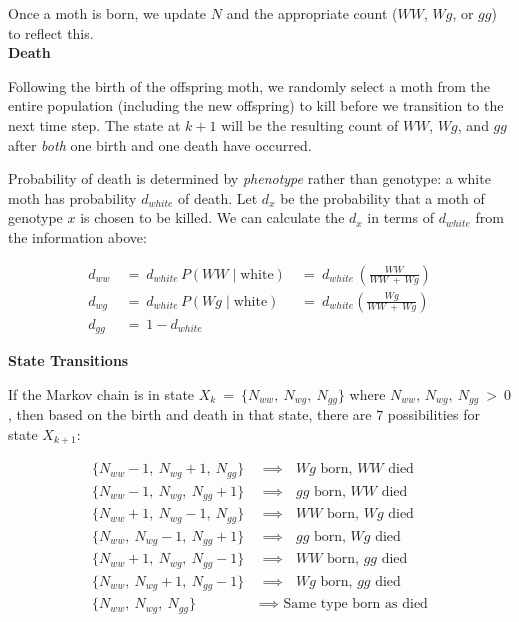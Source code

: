 \documentclass[leqno]{article}
\begin{document}
Once a moth is born, we update $N$ and the appropriate count ($WW$, $Wg$, or $gg$) to reflect this.\\

\textbf{Death}

Following the birth of the offspring moth, we randomly select a moth from the entire population (including the new offspring) to kill before we transition to the next time step. The state at $k + 1$ will be the resulting count of $WW$, $Wg$, and $gg$ after {\it both} one birth and one death have occurred.

\newpage

Probability of death is determined by {\it phenotype} rather than genotype: a white moth has probability $d_{white}$ of death. Let $d_x$ be the probability that a moth of genotype $x$ is chosen to be killed. We can calculate the $d_x$ in terms of $d_{white}$ from the information above:

\begin{align*}
d_{ww}\ &=\ d_{white}\, P(WW \mid \text{white})\ &=\ d_{white}\, \left(\frac{WW}{WW\ +\ Wg}\right)\\
d_{wg}\ &=\ d_{white}\, P(Wg \mid \text{white})\ &=\ d_{white}\left(\frac{Wg}{WW\ +\ Wg}\right)\\
d_{gg}\ &=\ 1 - d_{white}
\end{align*}

\textbf{State Transitions}

If the Markov chain is in state $X_k\ =\ \{N_{ww},\ N_{wg},\ N_{gg}\}$ where $N_{ww},\, N_{wg},\ N_{gg}\ >\ 0$, then based on the birth and death in that state, there are $7$ possibilities for state $X_{k + 1}$: 

\begin{align*}
\{N_{ww} - 1,\ N_{wg} + 1,\ N_{gg}\} &\ \implies \text{ $Wg$ born, $WW$ died}\\
\{N_{ww} - 1,\ N_{wg},\ N_{gg} + 1\} &\ \implies \text{ $gg$ born, $WW$ died}\\
\{N_{ww} + 1,\ N_{wg} - 1,\ N_{gg}\} &\ \implies \text{ $WW$ born, $Wg$ died}\\
\{N_{ww},\ N_{wg} - 1,\ N_{gg} + 1\} &\ \implies \text{ $gg$ born, $Wg$ died}\\
\{N_{ww} + 1,\ N_{wg},\ N_{gg} - 1\} &\ \implies \text{ $WW$ born, $gg$ died}\\
\{N_{ww},\ N_{wg} + 1,\ N_{gg} - 1\} &\ \implies \text{ $Wg$ born, $gg$ died}\\
\{N_{ww},\ N_{wg},\ N_{gg}\} &\ \implies \text{ Same type born as died}
\end{align*}
\end{document}
